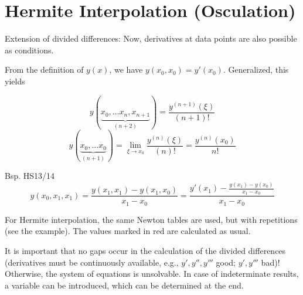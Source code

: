 \section{Hermite Interpolation (Osculation)}
Extension of divided differences: Now, derivatives at data points are also possible as conditions.

From the definition of $y(x)$, we have $y(x_0, x_0) = y'(x_0)$. Generalized, this yields

\begin{minipage}{9cm}

\[y(\underbrace{x_0, \ldots x_n, x_{n+1}}_{(n+2)}) = \frac{y^{(n+1)}(\xi)}{(n+1)!}\]
\[y(\underbrace{x_0, \ldots x_0}_{(n+1)}) = \lim_{\xi \rightarrow x_0} \frac{y^{(n)}(\xi)}{(n)!} = \frac{y^{(n)}(x_0)}{n!}\]
\end{minipage}
\begin{minipage}{6cm}
Bsp. HS13/14 \\
\[ y(x_0,x_1,x_1) = \frac{y(x_1,x_1) - y(x_1,x_0)}{x_1 - x_0} = \frac{y'(x_1) - \frac{y(x_1) - y(x_0)}{x_1 - x_0}}{x_1 - x_0}\]
\end{minipage}


For Hermite interpolation, the same Newton tables are used, but with repetitions (see the example).
The values marked in red are calculated as usual.

It is important that no gaps occur in the calculation of the divided differences
(derivatives must be continuously available, e.g., $y', y'', y'''$ good; $y', y'''$ bad)!
Otherwise, the system of equations is unsolvable.
In case of indeterminate results, a variable can be introduced, which can be determined at the end.


